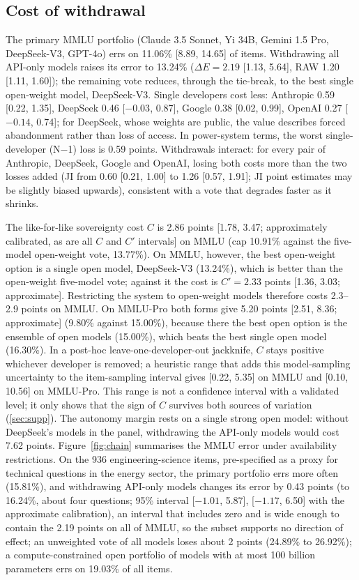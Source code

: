 \documentclass[preprint,12pt,authoryear]{elsarticle}
\newcommand{\dE}{\Delta E}
\begin{document}
\subsection{Cost of withdrawal}
The primary MMLU portfolio (Claude 3.5 Sonnet, Yi 34B, Gemini 1.5 Pro, DeepSeek-V3, GPT-4o) errs on 11.06\% [8.89, 14.65] of items. Withdrawing all API-only models raises its error to 13.24\% ($\dE = 2.19$ [1.13, 5.64], RAW 1.20 [1.11, 1.60]); the remaining vote reduces, through the tie-break, to the best single open-weight model, DeepSeek-V3. Single developers cost less: Anthropic 0.59 [0.22, 1.35], DeepSeek 0.46 [$-0.03$, 0.87], Google 0.38 [0.02, 0.99], OpenAI 0.27 [$-0.14$, 0.74]; for DeepSeek, whose weights are public, the value describes forced abandonment rather than loss of access. In power-system terms, the worst single-developer (N$-$1) loss is 0.59 points. Withdrawals interact: for every pair of Anthropic, DeepSeek, Google and OpenAI, losing both costs more than the two losses added (JI from 0.60 [0.21, 1.00] to 1.26 [0.57, 1.91]; JI point estimates may be slightly biased upwards), consistent with a vote that degrades faster as it shrinks.

The like-for-like sovereignty cost $C$ is 2.86 points [1.78, 3.47; approximately calibrated, as are all $C$ and $C'$ intervals] on MMLU (cap 10.91\% against the five-model open-weight vote, 13.77\%). On MMLU, however, the best open-weight option is a single open model, DeepSeek-V3 (13.24\%), which is better than the open-weight five-model vote; against it the cost is $C' = 2.33$ points [1.36, 3.03; approximate]. Restricting the system to open-weight models therefore costs 2.3--2.9 points on MMLU. On MMLU-Pro both forms give 5.20 points [2.51, 8.36; approximate] (9.80\% against 15.00\%), because there the best open option is the ensemble of open models (15.00\%), which beats the best single open model (16.30\%). In a post-hoc leave-one-developer-out jackknife, $C$ stays positive whichever developer is removed; a heuristic range that adds this model-sampling uncertainty to the item-sampling interval gives [0.22, 5.35] on MMLU and [0.10, 10.56] on MMLU-Pro. This range is not a confidence interval with a validated level; it only shows that the sign of $C$ survives both sources of variation (\ref{sec:supp}). The autonomy margin rests on a single strong open model: without DeepSeek's models in the panel, withdrawing the API-only models would cost 7.62 points. Figure~\ref{fig:chain} summarises the MMLU error under availability restrictions. On the 936 engineering-science items, pre-specified as a proxy for technical questions in the energy sector, the primary portfolio errs more often (15.81\%), and withdrawing API-only models changes its error by 0.43 points (to 16.24\%, about four questions; 95\% interval [$-1.01$, 5.87], [$-1.17$, 6.50] with the approximate calibration), an interval that includes zero and is wide enough to contain the 2.19 points on all of MMLU, so the subset supports no direction of effect; an unweighted vote of all models loses about 2 points (24.89\% to 26.92\%); a compute-constrained open portfolio of models with at most 100 billion parameters errs on 19.03\% of all items.
\end{document}
